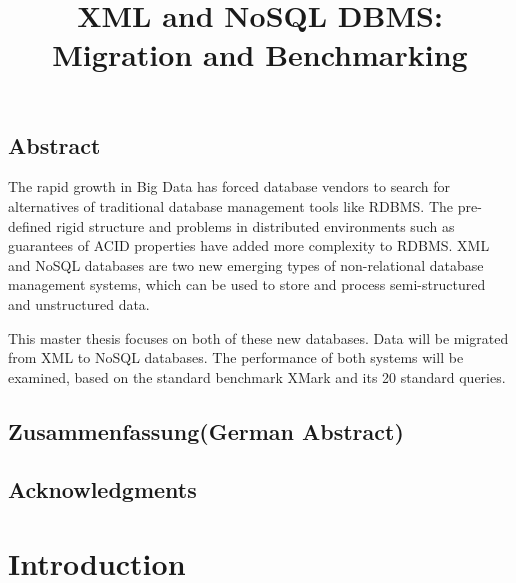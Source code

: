 \documentclass[a4paper,12pt]{book}
\title{XML and NoSQL DBMS: Migration and Benchmarking}
\subtitle{
}
\begin{document}
	\renewcommand{\lstlistingname}{Code}
	\maketitle
	\thispagestyle{empty}
	\newpage
	\section*{Abstract}
	
	The rapid growth in Big Data has forced database vendors to search for alternatives of traditional database management tools like RDBMS. The pre-defined rigid structure and problems in distributed environments such as guarantees of ACID properties have added more complexity to RDBMS. XML and NoSQL databases are two new emerging types of non-relational database management systems, which can be used to store and process semi-structured and unstructured data.
	
This master thesis focuses on both of these new databases. Data will be migrated from XML to NoSQL databases. The performance of both systems will be examined, based on the standard benchmark XMark and its 20 standard queries. 
	
	\section*{Zusammenfassung(German Abstract)}
	
	\section*{Acknowledgments}
	
	\thispagestyle{empty}
	\newpage
	\tableofcontents
	\thispagestyle{empty}
	\newpage
	\chapter{Introduction}
	\setcounter{page}{1}
\end{document}

